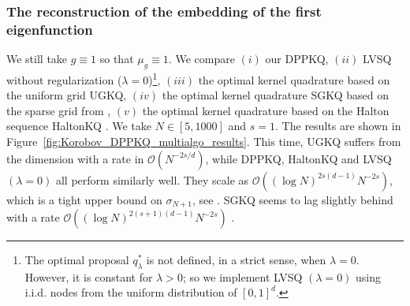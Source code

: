 \documentclass[twoside,11pt]{book}
\numberwithin{theorem}{chapter}
\numberwithin{definition}{chapter}
\numberwithin{proposition}{chapter}
\numberwithin{corollary}{chapter}
\numberwithin{example}{chapter}
\numberwithin{lemma}{chapter}
\numberwithin{assumption}{chapter}
\numberwithin{equation}{chapter}
\numberwithin{figure}{chapter}
\begin{document}
\subsubsection{The reconstruction of the embedding of the first eigenfunction}
We still take $g\equiv 1$ so that $\mu_{g} \equiv 1$. We compare $(i)$ our DPPKQ, $(ii)$ LVSQ without regularization ($\lambda =0$)\footnote{The optimal proposal $q_{\lambda}^*$ is not defined, in a strict sense, when $\lambda = 0$. However, it is constant for $\lambda>0$; so we implement LVSQ $(\lambda = 0)$ using i.i.d. nodes from the uniform distribution of $[0,1]^{d}$.}, $(iii)$ the optimal kernel quadrature based on the uniform grid UGKQ, $(iv)$ the optimal kernel quadrature SGKQ based on the sparse grid from \citep{Smo63}, $(v)$ the optimal kernel quadrature based on the Halton sequence HaltonKQ \citep{Hal64}. We take $N \in [5,1000]$ and $s =1$. The results are shown in Figure~\ref{fig:Korobov_DPPKQ_multialgo_results}. This time, UGKQ suffers from the dimension with a rate in $\mathcal{O}(N^{-2s/d})$, while DPPKQ, HaltonKQ and LVSQ $(\lambda = 0)$ all perform similarly well. They scale as $\mathcal{O}((\log N)^{2s(d-1)} N^{-2s})$, which is a tight upper bound on $\sigma_{N+1}$, see \citep{Bac17}.
 SGKQ seems to lag slightly behind with a rate $\mathcal{O}((\log N)^{2(s+1)(d-1)} N^{-2s})$ 
 \citep{Hol08,Smo63}.
\end{document}
